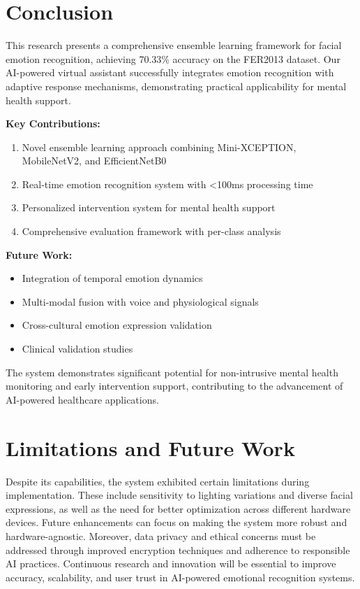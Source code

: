 \documentclass[conference]{IEEEtran}
\begin{document}
\section{Conclusion}

This research presents a comprehensive ensemble learning framework for facial emotion recognition, achieving 70.33\% accuracy on the FER2013 dataset. Our AI-powered virtual assistant successfully integrates emotion recognition with adaptive response mechanisms, demonstrating practical applicability for mental health support.

\textbf{Key Contributions:}
\begin{enumerate}
    \item Novel ensemble learning approach combining Mini-XCEPTION, MobileNetV2, and EfficientNetB0
    \item Real-time emotion recognition system with <100ms processing time
    \item Personalized intervention system for mental health support
    \item Comprehensive evaluation framework with per-class analysis
\end{enumerate}

\textbf{Future Work:}
\begin{itemize}
    \item Integration of temporal emotion dynamics
    \item Multi-modal fusion with voice and physiological signals
    \item Cross-cultural emotion expression validation
    \item Clinical validation studies
\end{itemize}

The system demonstrates significant potential for non-intrusive mental health monitoring and early intervention support, contributing to the advancement of AI-powered healthcare applications.

\section{Limitations and Future Work}
Despite its capabilities, the system exhibited certain limitations during implementation. These include sensitivity to lighting variations and diverse facial expressions, as well as the need for better optimization across different hardware devices. Future enhancements can focus on making the system more robust and hardware-agnostic. Moreover, data privacy and ethical concerns must be addressed through improved encryption techniques and adherence to responsible AI practices. Continuous research and innovation will be essential to improve accuracy, scalability, and user trust in AI-powered emotional recognition systems.



\end{document}
